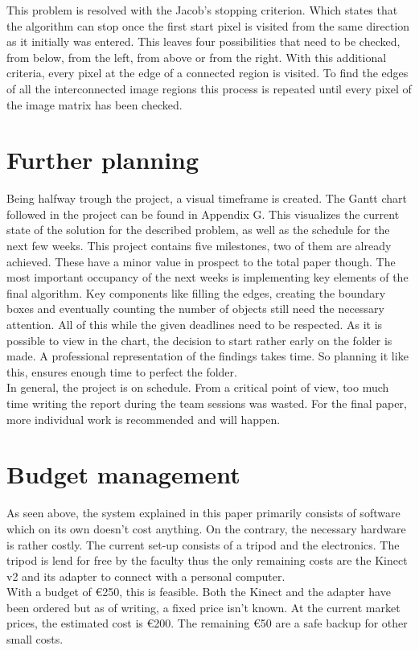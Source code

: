 \documentclass{article}
\begin{document}
\noindent This problem is resolved with the Jacob's stopping criterion. Which states that the algorithm can stop once the first start pixel is visited from the same direction as it initially was entered. This leaves four possibilities that need to be checked, from below, from the left, from above or from the right. With this additional criteria, every pixel at the edge of a connected region is visited. 
To find the edges of all the interconnected image regions this process is repeated until every pixel of the image matrix has been checked. 

\section{Further planning}
Being halfway trough the project, a visual timeframe is created. The Gantt chart followed in the project can be found in Appendix G.
This visualizes the current state of the solution for the described problem, as well as the schedule for the next few weeks. 
This project contains five milestones, two of them are already achieved. These have a minor value in prospect to the total paper though. The most important occupancy of the next weeks is implementing key elements of the final algorithm. Key components like filling the edges, creating the boundary boxes and eventually counting the number of objects still need the necessary attention. All of this while the given deadlines need to be respected. As it is possible to view in the chart, the decision to start rather early on the folder is made. A professional representation of the findings takes time. So planning it like this, ensures enough time to perfect the folder. \\
In general, the project is on schedule. From a critical point of view, too much time writing the report during the team sessions was wasted. For the final paper, more individual work is recommended and will happen.

\section{Budget management}
As seen above, the system explained in this paper primarily consists of software which on its own doesn't cost anything. On the contrary, the necessary hardware is rather costly. The current set-up consists of a tripod and the electronics. The tripod is lend for free by the faculty thus the only remaining costs are the Kinect v2 and its adapter to connect with a personal computer.\\
With a budget of \euro 250, this is feasible. Both the Kinect and the adapter have been ordered but as of writing, a fixed price isn't known. At the current market prices, the estimated cost is \euro 200. The remaining \euro 50 are a safe backup for other small costs.
\end{document}
